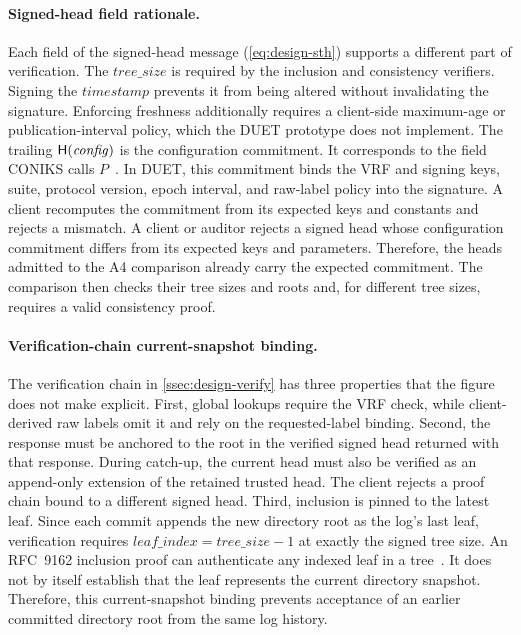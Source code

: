 \paragraph{Signed-head field rationale.} Each field of the signed-head message
(\cref{eq:design-sth}) supports a different part of verification. The
$\mathit{tree\_size}$ is required by the inclusion and consistency verifiers. Signing the
$\mathit{timestamp}$ prevents it from being altered without invalidating the signature. Enforcing
freshness additionally requires a client-side maximum-age or publication-interval policy, which
the DUET prototype does not implement. The trailing $\mathsf{H}(\mathit{config})$ is the configuration
commitment. It corresponds to the field CONIKS calls $P$~\cite[Section~3.3]{melara2015coniks}. In DUET, this commitment binds the VRF and signing keys,
suite, protocol version, epoch interval, and raw-label policy into the signature. A client
recomputes the commitment from its expected keys and constants and rejects a mismatch. A client or
auditor rejects a signed head whose configuration commitment differs from its expected keys and
parameters. Therefore, the heads admitted to the A4 comparison already carry the expected commitment.
The comparison then checks their tree sizes and roots and, for different tree sizes, requires a valid
consistency proof.

\paragraph{Verification-chain current-snapshot binding.} The verification chain in
\cref{ssec:design-verify} has three properties that the figure does not make explicit. First,
global lookups require the VRF check, while client-derived raw labels omit it and rely on the
requested-label binding. Second, the response must be anchored to the root in the verified signed head returned with that
response. During catch-up, the current head must also be verified as an append-only extension of
the retained trusted head. The client rejects a proof chain bound to a different signed head. Third,
inclusion is pinned to the latest leaf. Since each commit appends the new
directory root as the log's last leaf, verification requires
$\mathit{leaf\_index}=\mathit{tree\_size}-1$ at exactly the signed tree size. An RFC~9162
inclusion proof can authenticate any indexed leaf in a
tree~\cite[Section~2.1.3.2]{rfc9162}. It does not by itself establish that the leaf represents the
current directory snapshot. Therefore, this current-snapshot binding prevents acceptance of an earlier
committed directory root from the same log history.


